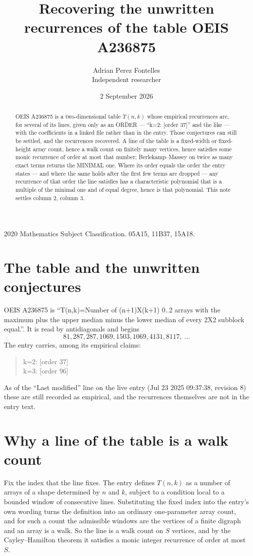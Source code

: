 \documentclass[11pt,a4paper]{article}
\title{Recovering the unwritten recurrences of the table OEIS A236875}
\author{Adrian Perez Fontelles\\ \small Independent researcher}
\date{2 September 2026}
\theoremstyle{plain}
\theoremstyle{definition}
\begin{document}
\maketitle

\begin{abstract}
OEIS A236875 is a two-dimensional table $T(n,k)$ whose empirical recurrences are, for several of
its lines, given only as an ORDER --- ``k=2: [order 37]'' and the like --- with the
coefficients in a linked file rather than in the entry. Those conjectures can still be settled,
and the recurrences recovered. A line of the table is a fixed-width or fixed-height array
count, hence a walk count on finitely many vertices, hence satisfies some monic recurrence of
order at most that number; Berlekamp--Massey on twice as many exact terms returns the MINIMAL
one. Where its order equals the order the entry states --- and where the same holds after the
first few terms are dropped --- any recurrence of that order the line satisfies has a
characteristic polynomial that is a multiple of the minimal one and of equal degree, hence is
that polynomial. This note settles column 2, column 3.
\end{abstract}

\noindent\small 2020 Mathematics Subject Classification. 05A15, 11B37, 15A18.\normalsize

\section{The table and the unwritten conjectures}

OEIS A236875 is ``T(n,k)=Number of (n+1)X(k+1) 0..2 arrays with the maximum plus the upper median minus the lower median of every 2X2 subblock equal.''. It is read by antidiagonals and begins
\[
81, 287, 287, 1069, 1503, 1069, 4131, 8117,\ \dots
\]
The entry carries, among its empirical claims:
\begin{quote}\small
k=2: [order 37]\\
k=3: [order 96]
\end{quote}
As of the ``Last modified'' line on the live entry (Jul 23 2025 09:37:38, revision 8) these are still
recorded as empirical, and the recurrences themselves are not in the entry text.

\section{Why a line of the table is a walk count}

Fix the index that the line fixes. The entry defines $T(n,k)$ as a number of arrays of a shape
determined by $n$ and $k$, subject to a condition local to a bounded window of consecutive
lines. Substituting the fixed index into the entry's own wording turns the definition into an
ordinary one-parameter array count, and for such a count the admissible windows are the
vertices of a finite digraph and an array is a walk. So the line is a walk count on $S$
vertices, and by the Cayley--Hamilton theorem it satisfies a monic integer recurrence of order
at most $S$.
\end{document}
